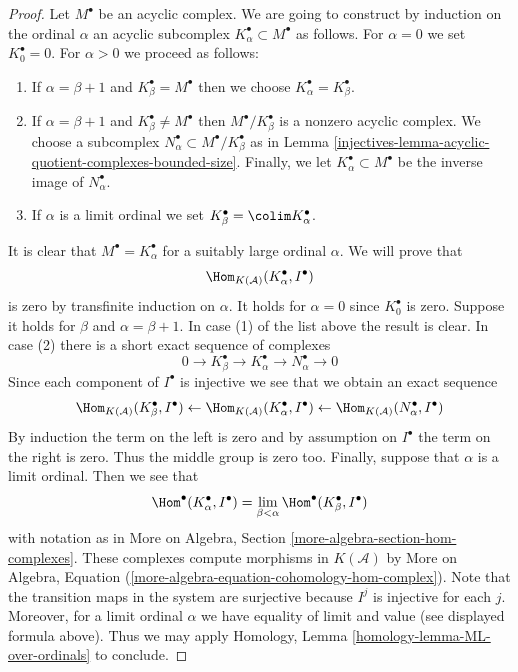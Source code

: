 \begin{proof}

Let $M^\bullet$ be an acyclic complex. We are going to construct by
induction on the ordinal $\alpha$ an acyclic subcomplex
$K_\alpha^\bullet \subset M^\bullet$ as follows.
For $\alpha = 0$ we set $K_0^\bullet = 0$. For $\alpha > 0$
we proceed as follows:
\begin{enumerate}
\item If $\alpha = \beta + 1$ and $K_\beta^\bullet = M^\bullet$
then we choose $K_\alpha^\bullet = K_\beta^\bullet$.
\item If $\alpha = \beta + 1$ and $K_\beta^\bullet \not = M^\bullet$
then $M^\bullet/K_\beta^\bullet$ is a nonzero acyclic complex.
We choose a subcomplex $N_\alpha^\bullet \subset M^\bullet/K_\beta^\bullet$
as in Lemma \ref{injectives-lemma-acyclic-quotient-complexes-bounded-size}.
Finally, we let $K_\alpha^\bullet \subset M^\bullet$
be the inverse image of $N_\alpha^\bullet$.
\item If $\alpha$ is a limit ordinal we set
$K_\beta^\bullet = \colim K_\alpha^\bullet$.
\end{enumerate}
It is clear that $M^\bullet = K_\alpha^\bullet$ for a suitably large
ordinal $\alpha$. We will prove that
$$
\Hom_{K(\mathcal{A})}(K_\alpha^\bullet, I^\bullet)
$$
is zero by transfinite induction on $\alpha$. It holds for $\alpha = 0$
since $K_0^\bullet$ is zero. Suppose it holds for $\beta$ and
$\alpha = \beta + 1$. In case (1) of the list above the result is clear.
In case (2) there is a short exact sequence of complexes
$$
0 \to K_\beta^\bullet \to K_\alpha^\bullet \to N_\alpha^\bullet \to 0
$$
Since each component of $I^\bullet$ is injective we see that we obtain
an exact sequence
$$
\Hom_{K(\mathcal{A})}(K_\beta^\bullet, I^\bullet) \leftarrow
\Hom_{K(\mathcal{A})}(K_\alpha^\bullet, I^\bullet) \leftarrow
\Hom_{K(\mathcal{A})}(N_\alpha^\bullet, I^\bullet)
$$
By induction the term on the left is zero and by assumption on $I^\bullet$
the term on the right is zero. Thus the middle group is zero too.
Finally, suppose that $\alpha$ is a limit ordinal. Then we see that
$$
\Hom^\bullet(K_\alpha^\bullet, I^\bullet) =
\lim_{\beta < \alpha} \Hom^\bullet(K_\beta^\bullet, I^\bullet)
$$
with notation as in
More on Algebra, Section \ref{more-algebra-section-hom-complexes}.
These complexes compute morphisms in $K(\mathcal{A})$ by
More on Algebra, Equation
(\ref{more-algebra-equation-cohomology-hom-complex}).
Note that the transition maps in the system are surjective
because $I^j$ is injective for each $j$. Moreover, for a limit
ordinal $\alpha$ we have equality of limit and value
(see displayed formula above). Thus we may apply
Homology, Lemma \ref{homology-lemma-ML-over-ordinals}
to conclude.
\end{proof}

